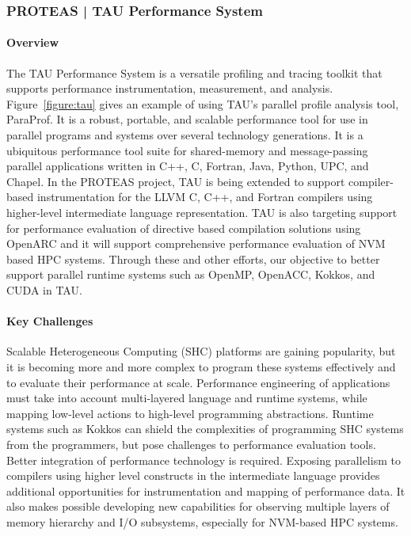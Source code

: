 \subsubsection{ PROTEAS | TAU Performance System}\label{subsubsect:tau}

\paragraph{Overview} 
The TAU Performance System is a versatile profiling and tracing toolkit that supports performance instrumentation, measurement, and analysis.  Figure~\ref{figure:tau} gives an example of using TAU's parallel profile analysis tool, ParaProf. It is a robust, portable, and scalable performance tool for use in parallel programs and systems over several technology generations. It is a ubiquitous performance tool suite for shared-memory and message-passing parallel applications written in C++, C, Fortran, Java, Python, UPC, and Chapel. In the PROTEAS project, TAU is being extended to support compiler-based instrumentation for the LLVM C, C++, and Fortran compilers using higher-level intermediate language representation. TAU is also targeting support for performance evaluation of directive based compilation solutions using OpenARC and it will support comprehensive performance evaluation of NVM based HPC systems.  Through these and other efforts, our objective to better support parallel runtime systems such as OpenMP, OpenACC, Kokkos, and CUDA in TAU. 

\paragraph{Key Challenges} 
Scalable Heterogeneous Computing (SHC) platforms are gaining popularity, but it is becoming more and more complex to program these systems effectively and to evaluate their performance at scale. Performance engineering of applications must take into account multi-layered language and runtime systems, while mapping low-level actions to high-level programming abstractions.  Runtime systems such as Kokkos can shield the complexities of programming SHC systems from the programmers, but pose challenges to performance evaluation tools.  Better integration of performance technology is required.  Exposing parallelism to compilers using higher level constructs in the intermediate language provides additional opportunities for instrumentation and mapping of performance data.  It also makes possible developing new capabilities for observing multiple layers of memory hierarchy and I/O subsystems, especially for NVM-based HPC systems. 


